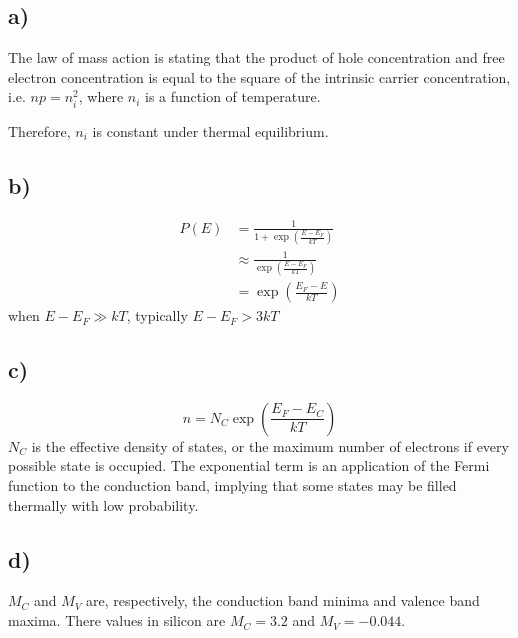 \subsection*{a)}
The law of mass action is stating that the product of hole concentration and free electron concentration is equal to the square of the intrinsic carrier concentration, i.e. $n p = n_i^2$, where $n_i$ is a function of temperature.

Therefore, $n_i$ is constant under thermal equilibrium.
\subsection*{b)}
\[
\begin{aligned}
P(E) &= \frac{1}{1+\exp\left(\frac{E-E_F}{k T}\right)} \\
&\approx \frac{1}{\exp\left(\frac{E-E_F}{k T}\right)} \\
&= \exp\left(\frac{E_F - E}{k T}\right)
\end{aligned}
\]
when $E - E_F \gg k T$, typically $E - E_F > 3 k T $
\subsection*{c)}
$$n = N_C \exp \left(\frac{E_F - E_C}{k T} \right)$$
$N_C$ is the effective density of states, or the maximum number of electrons if every possible state is occupied.
The exponential term is an application of the Fermi function to the conduction band, implying that some states 
may be filled thermally with low probability.
\subsection*{d)}
$M_C$ and $M_V$ are, respectively, the conduction band minima and valence band maxima. There values in silicon are $M_C = 3.2$ and $M_V = -0.044$. %